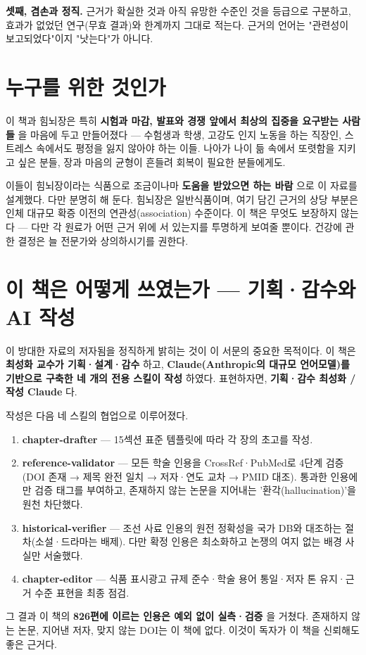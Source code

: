 \documentclass[11pt,oneside]{book}
\begin{document}
\textbf{셋째, 겸손과 정직.} 근거가 확실한 것과 아직 유망한 수준인 것을 등급으로 구분하고, 효과가 없었던 연구(무효 결과)와 한계까지 그대로 적는다. 근거의 언어는 "관련성이 보고되었다"이지 "낫는다"가 아니다.

\section{누구를 위한 것인가}
이 책과 힘뇌장은 특히 \textbf{시험과 마감, 발표와 경쟁 앞에서 최상의 집중을 요구받는 사람들} 을 마음에 두고 만들어졌다 — 수험생과 학생, 고강도 인지 노동을 하는 직장인, 스트레스 속에서도 평정을 잃지 않아야 하는 이들. 나아가 나이 듦 속에서 또렷함을 지키고 싶은 분들, 장과 마음의 균형이 흔들려 회복이 필요한 분들에게도.

이들이 힘뇌장이라는 식품으로 조금이나마 \textbf{도움을 받았으면 하는 바람} 으로 이 자료를 설계했다. 다만 분명히 해 둔다. 힘뇌장은 일반식품이며, 여기 담긴 근거의 상당 부분은 인체 대규모 확증 이전의 연관성(association) 수준이다. 이 책은 무엇도 보장하지 않는다 — 다만 각 원료가 어떤 근거 위에 서 있는지를 투명하게 보여줄 뿐이다. 건강에 관한 결정은 늘 전문가와 상의하시기를 권한다.

\section{이 책은 어떻게 쓰였는가 — 기획·감수와 AI 작성}
이 방대한 자료의 저자됨을 정직하게 밝히는 것이 이 서문의 중요한 목적이다. 이 책은 \textbf{최성화 교수가 기획·설계·감수} 하고, \textbf{Claude(Anthropic의 대규모 언어모델)를 기반으로 구축한 네 개의 전용 스킬이 작성} 하였다. 표현하자면, \textbf{기획·감수 최성화 / 작성 Claude} 다.

작성은 다음 네 스킬의 협업으로 이루어졌다.

\begin{enumerate}[leftmargin=6mm,itemsep=1pt,topsep=2pt]
  \item \textbf{chapter-drafter} — 15섹션 표준 템플릿에 따라 각 장의 초고를 작성.
  \item \textbf{reference-validator} — 모든 학술 인용을 CrossRef·PubMed로 4단계 검증(DOI 존재 → 제목 완전 일치 → 저자·연도 교차 → PMID 대조). 통과한 인용에만 검증 태그를 부여하고, 존재하지 않는 논문을 지어내는 '환각(hallucination)'을 원천 차단했다.
  \item \textbf{historical-verifier} — 조선 사료 인용의 원전 정확성을 국가 DB와 대조하는 절차(소설·드라마는 배제). 다만 확정 인용은 최소화하고 논쟁의 여지 없는 배경 사실만 서술했다.
  \item \textbf{chapter-editor} — 식품 표시광고 규제 준수·학술 용어 통일·저자 톤 유지·근거 수준 표현을 최종 점검.
\end{enumerate}
그 결과 이 책의 \textbf{826편에 이르는 인용은 예외 없이 실측·검증} 을 거쳤다. 존재하지 않는 논문, 지어낸 저자, 맞지 않는 DOI는 이 책에 없다. 이것이 독자가 이 책을 신뢰해도 좋은 근거다.
\end{document}
